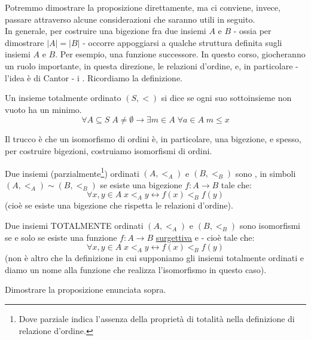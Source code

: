 \documentclass[11pt]{scrartcl}
\begin{document}
Potremmo dimostrare la proposizione direttamente, ma ci conviene, invece, passare attraverso alcune considerazioni che saranno utili in seguito.\\
In generale, per costruire una bigezione fra due insiemi $A$ e $B$ - ossia per dimostrare $|A| = |B|$ - occorre appoggiarsi a qualche struttura definita sugli insiemi $A$
e $B$. Per esempio, una funzione successore. In questo corso, giocheranno un ruolo importante, in questa direzione, le relazioni d'ordine, e, in particolare - l'idea è di Cantor - i 
. Ricordiamo la definizione.

\begin{definition}
	Un insieme totalmente ordinato $(S,<)$ si dice  se ogni suo sottoinsieme non vuoto ha un minimo.
	\[ \forall A \subseteq S \; A \ne \emptyset \rightarrow \exists m \in A \; \forall a \in A \; m \leq x
		\]
\end{definition}

Il trucco è che un isomorfismo di ordini è, in particolare, una bigezione, e spesso, per costruire bigezioni, costruiamo isomorfismi di ordini.

\begin{definition}[Isomorfismo]
	Due insiemi (parzialmente\footnote{Dove parziale indica l'assenza della proprietà di totalità nella definizione di relazione d'ordine.}) ordinati
	$(A,<_A)$ e $(B,<_B)$ sono , in simboli $(A,<_A) \sim (B,<_B)$ se esiste una bigezione $f : A \rightarrow B$ tale che:
	\[ \forall x,y \in A \; x <_A y \longleftrightarrow f(x) <_B f(y)
		\]
	(cioè se esiste una bigezione che rispetta le relazioni d'ordine).
\end{definition}

\begin{remark}
	Due insiemi TOTALMENTE ordinati $(A,<_A)$ e $(B,<_B)$ sono isomorfismi se e solo se esiste una funzione $f : A \rightarrow B$ \underline{surgettiva} e  - cioè tale che:
	\[ \forall x,y \in A \; x <_A y \longleftrightarrow f(x) <_B f(y)
		\]
	(non è altro che la definizione in cui supponiamo gli insiemi totalmente ordinati e diamo un nome alla funzione che realizza l'isomorfismo in questo caso).
\end{remark}

\begin{exercise}
	Dimostrare la proposizione enunciata sopra.
\end{exercise}
\end{document}
